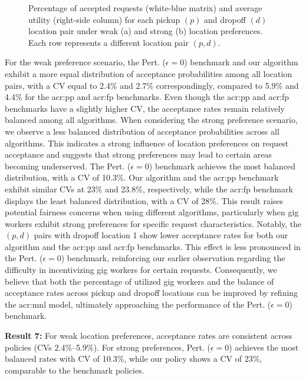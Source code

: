 \begin{figure}[t]%
    \centering
    \fontsize{10}{10}\selectfont
    \hspace*{0.1cm}
    \caption{\textnormal{Percentage of accepted requests (white-blue matrix) and average utility (right-side column) for each pickup $(p)$ and dropoff $(d)$ location pair under weak (a) and strong (b) location preferences. Each row represents a different location pair $(p,d)$.}}%
    \label{fig:fair_nyt_combined}%
\end{figure}

For the weak preference scenario, the Pert. ($\epsilon=0$) benchmark and our algorithm exhibit a more equal distribution of acceptance probabilities among all location pairs, with a CV equal to 2.4\% and 2.7\% correspondingly, compared to 5.9\% and 4.4\% for the \gls{acr:pp} and \gls{acr:fp} benchmarks. Even though the \gls{acr:pp} and \gls{acr:fp} benchmarks have a slightly higher CV, the acceptance rates remain relatively balanced among all algorithms. When considering the strong preference scenario, we observe a less balanced distribution of acceptance probabilities  across all algorithms. This indicates a strong influence of location preferences on request acceptance and suggests that strong preferences may lead to certain areas becoming underserved. The Pert. ($\epsilon=0$) benchmark achieves the most balanced distribution, with a CV of 10.3\%. Our algorithm and the \gls{acr:pp} benchmark exhibit similar CVs at 23\% and 23.8\%, respectively, while the \gls{acr:fp} benchmark displays the least balanced distribution, with a CV of 28\%. This result raises potential fairness concerns when using different algorithms, particularly when gig workers exhibit strong preferences for specific request characteristics. Notably, the $(p,d)$ pairs with dropoff location 1 show lower acceptance rates for both our algorithm and the \gls{acr:pp} and \gls{acr:fp} benchmarks. This effect is less pronounced in the Pert. ($\epsilon=0$) benchmark, reinforcing our earlier observation regarding the difficulty in incentivizing gig workers for certain requests. Consequently, we believe that both the percentage of utilized gig workers and the balance of acceptance rates across pickup and dropoff locations can be improved by refining the \gls{acr:mnl} model, ultimately approaching the performance of the Pert. ($\epsilon=0$) benchmark.

\noindent \textbf{Result 7:} For weak location preferences, acceptance rates are consistent across policies (CVs 2.4\%–5.9\%). For strong preferences, Pert. ($\epsilon=0$) achieves the most balanced rates with CV of 10.3\%, while our policy shows a CV of 23\%, comparable to the benchmark policies.
